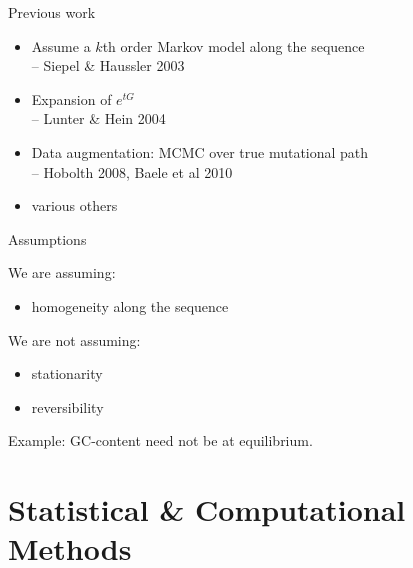 \documentclass[smaller]{beamer}
\begin{document}
\begin{frame}{Previous work}

  \begin{itemize}

    \item Assume a $k$th order Markov model along the sequence \\
      -- Siepel \& Haussler 2003

    \item Expansion of $e^{tG}$ \\
      -- Lunter \& Hein 2004 

    \item Data augmentation: MCMC over true mutational path \\
      -- Hobolth 2008, Baele et al 2010

    \item various others

  \end{itemize}

\end{frame}

\begin{frame}{Assumptions}

  We are assuming:
  \begin{itemize}

    \item homogeneity along the sequence

  \end{itemize}

  \vspace{2em}

  We are not assuming:
  \begin{itemize}

    \item stationarity

    \item reversibility

  \end{itemize}

  \vspace{2em}

  Example: GC-content need not be at equilibrium.

\end{frame}


\section{Statistical \& Computational Methods}
\end{document}
